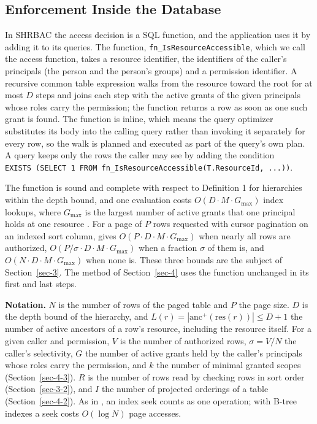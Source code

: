 \documentclass[conference]{IEEEtran}
\begin{document}
\subsection{Enforcement Inside the Database}\label{sec-2-4}

In SHRBAC the access decision is a SQL function, and the application uses it by adding it to its queries. The function, \texttt{fn\_IsResourceAccessible}, which we call the access function, takes a resource identifier, the identifiers of the caller's principals (the person and the person's groups) and a permission identifier. A recursive common table expression walks from the resource toward the root for at most \(D\) steps and joins each step with the active grants of the given principals whose roles carry the permission; the function returns a row as soon as one such grant is found. The function is inline, which means the query optimizer substitutes its body into the calling query rather than invoking it separately for every row, so the walk is planned and executed as part of the query's own plan. A query keeps only the rows the caller may see by adding the condition \texttt{EXISTS\ (SELECT\ 1\ FROM\ fn\_IsResourceAccessible(T.ResourceId,\ ...))}.

The function is sound and complete with respect to Definition 1 for hierarchies within the depth bound, and one evaluation costs \(O(D \cdot M \cdot G_{\max})\) index lookups, where \(G_{\max}\) is the largest number of active grants that one principal holds at one resource \cite{ref8}. For a page of \(P\) rows requested with cursor pagination on an indexed sort column, \cite{ref8} gives \(O(P \cdot D \cdot M \cdot G_{\max})\) when nearly all rows are authorized, \(O(P/\sigma \cdot D \cdot M \cdot G_{\max})\) when a fraction \(\sigma\) of them is, and \(O(N \cdot D \cdot M \cdot G_{\max})\) when none is. These three bounds are the subject of Section~\ref{sec-3}. The method of Section~\ref{sec-4} uses the function unchanged in its first and last steps.

\textbf{Notation.} \(N\) is the number of rows of the paged table and \(P\) the page size. \(D\) is the depth bound of the hierarchy, and \(L(r) = |\mathrm{anc}^{+}(\mathrm{res}(r))| \le D + 1\) the number of active ancestors of a row's resource, including the resource itself. For a given caller and permission, \(V\) is the number of authorized rows, \(\sigma = V/N\) the caller's selectivity, \(G\) the number of active grants held by the caller's principals whose roles carry the permission, and \(k\) the number of minimal granted scopes (Section~\ref{sec-4-3}). \(R\) is the number of rows read by checking rows in sort order (Section~\ref{sec-3-2}), and \(I\) the number of projected orderings of a table (Section~\ref{sec-4-2}). As in \cite{ref8}, an index seek counts as one operation; with B-tree indexes a seek costs \(O(\log N)\) page accesses.
\end{document}
